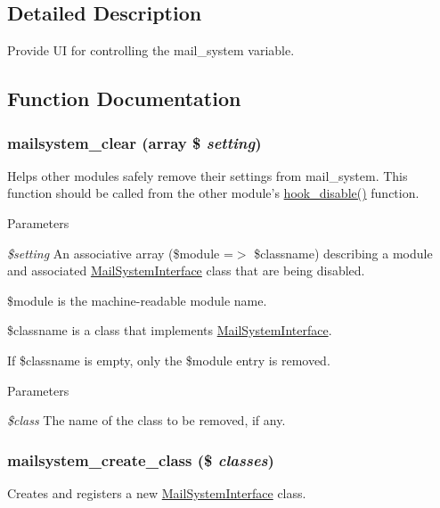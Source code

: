 \subsection{Detailed Description}
Provide UI for controlling the mail\_\-system variable. 

\subsection{Function Documentation}
\hypertarget{mailsystem_8module_ad8ad240cc7b72d29e1dad8cba00f85b0}{
\subsubsection[{mailsystem\_\-clear}]{\setlength{\rightskip}{0pt plus 5cm}mailsystem\_\-clear (array \$ {\em setting})}}
\label{mailsystem_8module_ad8ad240cc7b72d29e1dad8cba00f85b0}
Helps other modules safely remove their settings from mail\_\-system. This function should be called from the other module's \hyperlink{group__hooks_ga5872573d2180aa4b306e7d6c08a74c10}{hook\_\-disable()} function.


\begin{DoxyParams}{Parameters}
\item[{\em \$setting}]An associative array (\$module =$>$ \$classname) describing a module and associated \hyperlink{interfaceMailSystemInterface}{MailSystemInterface} class that are being disabled.
\begin{DoxyItemize}
\item \$module is the machine-\/readable module name.
\item \$classname is a class that implements \hyperlink{interfaceMailSystemInterface}{MailSystemInterface}.
\end{DoxyItemize}\end{DoxyParams}
If \$classname is empty, only the \$module entry is removed.


\begin{DoxyParams}{Parameters}
\item[{\em \$class}]The name of the class to be removed, if any. \end{DoxyParams}
\hypertarget{mailsystem_8module_ab195299394dfae7d0d164998d261ed36}{
\subsubsection[{mailsystem\_\-create\_\-class}]{\setlength{\rightskip}{0pt plus 5cm}mailsystem\_\-create\_\-class (\$ {\em classes})}}
\label{mailsystem_8module_ab195299394dfae7d0d164998d261ed36}
Creates and registers a new \hyperlink{interfaceMailSystemInterface}{MailSystemInterface} class.

